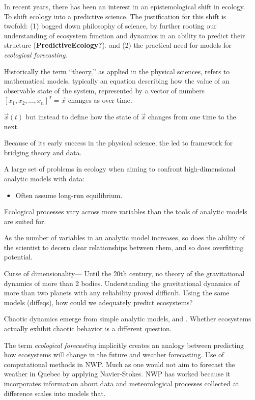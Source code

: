 \documentclass[10pt,oneside]{article}
\begin{document}
In recent years, there has been an interest in an epistemological shift
in ecology. To shift ecology into a predictive science. The
justification for this shift is twofold: (1) bogged down philosophy of
science, by further rooting our understanding of ecosystem function and
dynamics in an ability to predict their structure
(\textbf{PredictiveEcology?}). and (2) the practical need for models for
\emph{ecological forecasting}.

Historically the term ``theory,'' as applied in the physical sciences,
refers to mathematical models, typically an equation describing how the
value of an observable state of the system, represented by a vector of
numbers \([x_1, x_2, \dots, x_n]^T = \vec{x}\) changes as over time.

\(\vec{x}(t)\) but instead to define how the state of \(\vec{x}\)
changes from one time to the next.

Because of its early success in the physical science, the led to
framework for bridging theory and data.

A large set of problems in ecology when aiming to confront
high-dimensional analytic models with data:

\begin{itemize}
\tightlist
\item
  Often assume long-run equilibrium.
\end{itemize}

Ecological processes vary across more variables than the tools of
analytic models are suited for.

As the number of variables in an analytic model increases, so does the
ability of the scientist to decern clear relationships between them, and
so does overfitting potential.

Curse of dimensionality--- Until the 20th century, no theory of the
gravitational dynamics of more than 2 bodies. Understanding the
gravitational dynamics of more than two planets with any reliability
proved difficult. Using the same models (diffeqs), how could we
adequately predict ecosystems?

Chaotic dynamics emerge from simple analytic models, and . Whether
ecosystems actually exhibit chaotic behavior is a different question.

The term \emph{ecological forecasting} implicitly creates an analogy
between predicting how ecosystems will change in the future and weather
forecasting. Use of computational methods in NWP. Much as one would not
aim to forecast the weather in Quebec by applying Navier-Stokes. NWP has
worked because it incorporates information about data and meteorological
processes collected at difference scales into models that.
\end{document}
